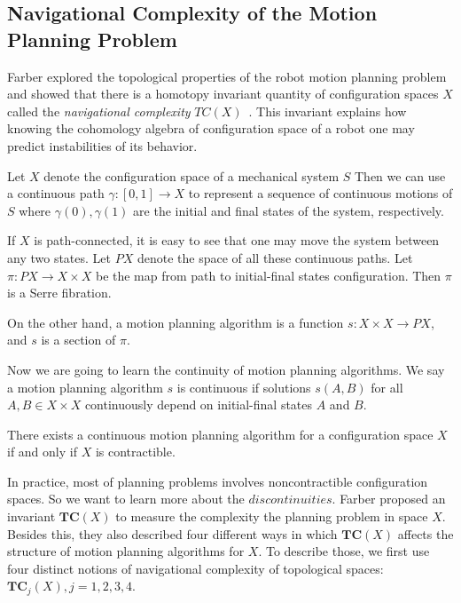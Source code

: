 \subsection{Navigational Complexity of the Motion Planning Problem}
Farber explored the topological properties of the robot motion planning problem and showed that there is a homotopy invariant quantity of configuration spaces \(X\) called the \textit{navigational complexity} \(TC(X)\)~\cite{farber2003topological,farber2004instabilities}.
This invariant explains how knowing the cohomology algebra of
configuration space of a robot one may predict instabilities of its behavior.

Let \(X\) denote the configuration space of a mechanical system \(S\)
Then we can use a continuous path \(\gamma:[0,1]\to X\) to represent a sequence of continuous motions of \(S\) where \(\gamma(0),\gamma(1)\) are the initial and final states of the system, respectively.

If \(X\) is path-connected, it is easy to see that one may move the system between any two states.
Let \(PX\) denote the space of all these continuous paths.
Let \(\pi:PX\to X\times X\) be the map from path to initial-final states configuration.
Then \(\pi\) is a Serre fibration.

On the other hand, a motion planning algorithm is a function \(s:X\times X\to PX\), and \(s\) is a section of \(\pi\).

Now we are going to learn the continuity of motion planning algorithms.
We say a motion planning algorithm \(s\) is continuous if solutions \(s(A,B)\) for all \(A,B\in X\times X\) continuously depend on initial-final states \(A\) and \(B\).

\begin{lemma}
There exists a continuous motion planning algorithm for a configuration space \(X\) if and only if \(X\) is contractible.
\end{lemma}
In practice, most of planning problems involves noncontractible configuration spaces.
So we want to learn more about the \(discontinuities\).
Farber proposed an invariant \(\mathbf{TC}(X)\) to measure the complexity the planning problem in space \(X\).
Besides this, they also described four different ways in which \(\mathbf{TC}(X)\) affects the structure of motion planning algorithms for \(X\).
To describe those, we first use four distinct notions of navigational complexity of topological spaces: \(\mathbf{TC}_j(X), j=1,2,3,4\).

